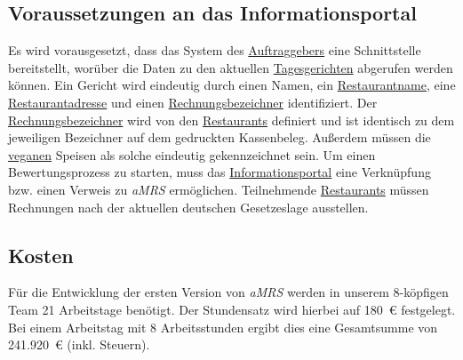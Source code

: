 \subsection{Voraussetzungen an das Informationsportal}
Es wird vorausgesetzt, dass das System des \hyperref[gls:auftraggeber]{Auftraggebers} eine Schnittstelle bereitstellt, worüber die Daten zu den aktuellen \hyperref[gls:tagesgericht]{Tagesgerichten} abgerufen werden können.
Ein Gericht wird eindeutig durch einen Namen, ein \hyperref[gls:restaurantname]{Restaurantname}, eine \hyperref[gls:restaurantadresse]{Restaurantadresse} und einen \hyperref[gls:Rechnungsbezeichner]{Rechnungsbezeichner} identifiziert.
Der \hyperref[gls:Rechnungsbezeichner]{Rechnungsbezeichner} wird von den \hyperref[gls:restaurant]{Restaurants} definiert und ist identisch zu dem jeweiligen Bezeichner auf dem gedruckten Kassenbeleg.
Außerdem müssen die \hyperref[gls:vegan]{veganen} Speisen als solche eindeutig gekennzeichnet sein.
\newparagraph
Um einen Bewertungsprozess zu starten, muss das \hyperref[gls:informationsportal]{Informationsportal} eine Verknüpfung bzw. einen Verweis zu \textit{\ac{aMRS}} ermöglichen.
Teilnehmende \hyperref[gls:restaurant]{Restaurants} müssen Rechnungen nach der aktuellen deutschen Gesetzeslage ausstellen.

\subsection{Kosten}


Für die Entwicklung der ersten Version von \textit{\ac{aMRS}} werden in unserem 8-köpfigen Team 21 Arbeitstage benötigt.
Der Stundensatz wird hierbei auf 180~€ festgelegt.
Bei einem Arbeitstag mit 8 Arbeitsstunden ergibt dies eine Gesamtsumme von 241.920~€ (inkl. Steuern).


